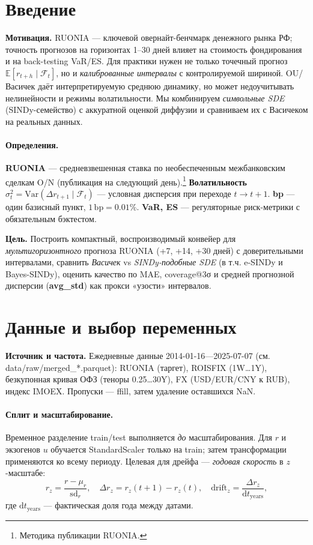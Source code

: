 \documentclass[14pt]{extarticle}
\begin{document}
\section{Введение}
\textbf{Мотивация.}
RUONIA — ключевой овернайт-бенчмарк денежного рынка РФ; точность прогнозов на горизонтах 1–30 дней влияет на стоимость фондирования и на back-testing VaR/ES. Для практики нужен не только точечный прогноз $\mathbb{E}[r_{t+h}\mid\mathcal F_t]$, но и \emph{калиброванные интервалы} с контролируемой шириной. OU/Васичек даёт интерпретируемую среднюю динамику, но может недоучитывать нелинейности и режимы волатильности. Мы комбинируем \emph{символьные SDE} (SINDy-семейство) с аккуратной оценкой диффузии и сравниваем их с Васичеком на реальных данных.

\paragraph{Определения.}
\textbf{RUONIA} — средневзвешенная ставка по необеспеченным межбанковским сделкам O/N (публикация на следующий день).\footnote{Методика публикации RUONIA.}
\textbf{Волатильность} $\sigma_t^2=\mathrm{Var}(\Delta r_{t+1}\mid\mathcal F_t)$ — условная дисперсия при переходе $t\!\to\! t\!+\!1$.
\textbf{bp} — один базисный пункт, $1\,\mathrm{bp}=0.01\%$.
\textbf{VaR, ES} — регуляторные риск-метрики с обязательным бэктестом.

\vspace{0.25em}
\noindent\textbf{Цель.} Построить компактный, воспроизводимый конвейер для \emph{мультигоризонтного} прогноза RUONIA (+7, +14, +30 дней) с доверительными интервалами, сравнить \emph{Васичек} vs \emph{SINDy-подобные SDE} (в т.ч. e-SINDy и Bayes-SINDy), оценить качество по MAE, coverage@3σ и средней прогнозной дисперсии (\textbf{avg\_std}) как прокси «узости» интервалов.

\section{Данные и выбор переменных}
\textbf{Источник и частота.} Ежедневные данные 2014-01-16—2025-07-07 (см. data/raw/merged\_*.parquet): RUONIA (таргет), ROISFIX (1W…1Y), безкупонная кривая ОФЗ (теноры 0.25…30Y), FX (USD/EUR/CNY к RUB), индекс IMOEX. Пропуски — ffill, затем удаление оставшихся NaN.

\paragraph{Сплит и масштабирование.}
Временное разделение train/test выполняется \emph{до} масштабирования. Для $r$ и экзогенов $u$ обучается StandardScaler только на train; затем трансформации применяются ко всему периоду. Целевая для дрейфа — \emph{годовая скорость} в $z$-масштабе:
\[
r_z=\frac{r-\mu_r}{\mathrm{sd}_r},\quad 
\Delta r_z=r_z(t{+}1)-r_z(t),\quad 
\mathrm{drift}_z=\frac{\Delta r_z}{\mathrm{d}t_{\text{years}}},
\]
где $\mathrm{d}t_{\text{years}}$ — фактическая доля года между датами.
\end{document}
